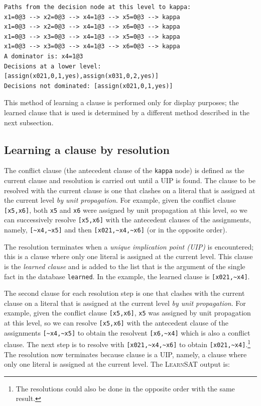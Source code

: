 \documentclass[11pt]{report}
\newcommand*{\p}[1]{\textup{\texttt{#1}}}
\newcommand*{\ls}{\textsc{LearnSAT}}
\begin{document}
\begin{verbatim}
Paths from the decision node at this level to kappa:
x1=0@3 --> x2=0@3 --> x4=1@3 --> x5=0@3 --> kappa
x1=0@3 --> x2=0@3 --> x4=1@3 --> x6=0@3 --> kappa
x1=0@3 --> x3=0@3 --> x4=1@3 --> x5=0@3 --> kappa
x1=0@3 --> x3=0@3 --> x4=1@3 --> x6=0@3 --> kappa
A dominator is: x4=1@3
Decisions at a lower level: [assign(x021,0,1,yes),assign(x031,0,2,yes)]
Decisions not dominated: [assign(x021,0,1,yes)]
\end{verbatim}

This method of learning a clause is performed only for display purposes;
the learned clause that is used is determined by a different method
described in the next subsection.

\subsection{Learning a clause by resolution}

The conflict clause (the antecedent clause of the \p{kappa} node) is defined
as the current clause and resolution is carried out until a UIP is found.
The clause to be resolved with the current clause is one that clashes on a literal
that is assigned at the current level \emph{by unit propagation}. For
example, given the conflict clause \p{[x5,x6]}, both
\p{x5} and \p{x6} were assigned by unit propagation at this level, so we
can successively resolve \p{[x5,x6]} with the antecedent clauses of the
assignments, namely, \verb+[~x4,~x5]+ and then \verb+[x021,~x4,~x6]+ (or
in the opposite order). 

The resolution terminates when a \emph{unique
implication point (UIP)} is encountered; this is a clause where only one
literal is assigned at the current level. This clause is the
\emph{learned clause} and is added to the list that is the argument of
the single fact in the database \p{learned}. In the example, the learned
clause is \verb+[x021,~x4]+.

The second clause for each resolution step is one that clashes with the
current clause on a literal that is assigned at the current level
\emph{by unit propagation}. For example, given the conflict clause
\p{[x5,x6]}, \p{x5} was assigned by unit propagation at this level, so
we can resolve \p{[x5,x6]} with the antecedent clause of the assignments
\verb+[~x4,~x5]+ to obtain the resolvent \verb+[x6,~x4]+ which is also a
conflict clause. The next step is to resolve with \verb+[x021,~x4,~x6]+
to obtain \verb+[x021,~x4]+.\footnote{The resolutions could also be done
in the opposite order with the same result.} The resolution now
terminates because clause is a UIP, namely, a clause where only one
literal is assigned at the current level. The \ls{} output is:
\end{document}
